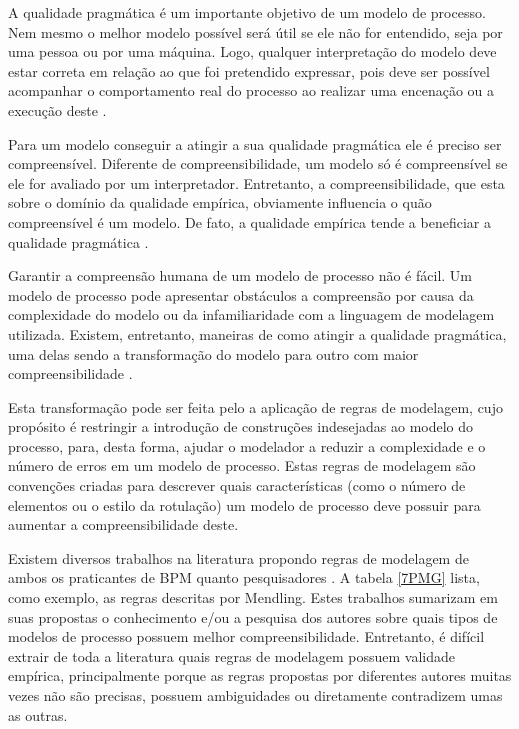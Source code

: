 \documentclass[12pt]{article}
\begin{document}
A qualidade pragmática é um importante objetivo de um modelo de processo. Nem mesmo o melhor modelo possível será útil se ele não for entendido, seja por uma pessoa ou por uma máquina. Logo, qualquer interpretação do modelo deve estar correta em relação ao que foi pretendido expressar, pois deve ser possível acompanhar o comportamento real do processo ao realizar uma encenação ou a execução deste \cite{Krogstie2012}.

Para um modelo conseguir a atingir a sua qualidade pragmática ele é preciso ser compreensível. Diferente de compreensibilidade, um modelo só é compreensível se ele for avaliado por um interpretador. Entretanto, a compreensibilidade, que esta sobre o domínio da qualidade empírica, obviamente influencia o quão compreensível é um modelo. De fato, a qualidade empírica tende a beneficiar a qualidade pragmática \cite{Krogstie2012}.

Garantir a compreensão humana de um modelo de processo não é fácil. Um modelo de processo pode apresentar obstáculos a compreensão por causa da complexidade do modelo ou da infamiliaridade com a linguagem de modelagem utilizada. Existem, entretanto, maneiras de como atingir a qualidade pragmática, uma delas sendo a transformação do modelo para outro com maior compreensibilidade \cite{Krogstie2012}. 

Esta transformação pode ser feita pelo a aplicação de regras de modelagem, cujo propósito é restringir a introdução de construções indesejadas ao modelo do processo, para, desta forma, ajudar o modelador a reduzir a complexidade e o número de erros em um modelo de processo. Estas regras de modelagem são convenções criadas para descrever quais características (como o número de elementos ou o estilo da rotulação) um modelo de processo deve possuir para aumentar a compreensibilidade deste.

Existem diversos trabalhos na literatura propondo regras de modelagem de ambos os praticantes de BPM \cite{Silver2009} \cite{White2008} \cite{Allweyer2010} quanto pesquisadores \cite{Becker2000} \cite{Mendling2007} \cite{Vanderfeesten2008} \cite{Correia2012}. A tabela \ref{7PMG} lista, como exemplo, as regras descritas por Mendling. Estes trabalhos sumarizam em suas propostas o conhecimento e/ou a pesquisa dos autores sobre quais tipos de modelos de processo possuem melhor compreensibilidade. Entretanto, é difícil extrair de toda a literatura quais regras de modelagem possuem validade empírica, principalmente porque as regras propostas por diferentes autores muitas vezes não são precisas, possuem ambiguidades ou diretamente contradizem umas as outras. 
\end{document}
